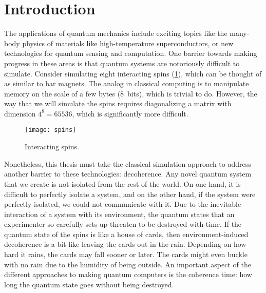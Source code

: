 \chapter*{Introduction}

The applications of quantum mechanics include exciting topics like the many-body
physics of materials like high-temperature superconductors, or new technologies
for quantum sensing and computation. One barrier towards making progress in
these areas is that quantum systems are notoriously difficult to simulate.
Consider simulating eight interacting spins (\cref{fig:spins}), which can be
thought of as similar to bar magnets. The analog in classical computing is to
manipulate memory on the scale of a few bytes (\SI{8}{bits}), which is trivial
to do. However, the way that we will simulate the spins requires diagonalizing a
matrix with dimension $4^8 = \num{65536}$, which is significantly more
difficult.

\begin{figure}[ht]
  \centering
  \texttt{[image: spins]}
  \caption{%
    Interacting spins.
  }\label{fig:spins}
\end{figure}

Nonetheless, this thesis must take the classical simulation approach to address
another barrier to these technologies: decoherence. Any novel quantum system
that we create is not isolated from the rest of the world. On one hand, it is
difficult to perfectly isolate a system, and on the other hand, if the system
were perfectly isolated, we could not communicate with it. Due to the inevitable
interaction of a system with its environment, the quantum states that an
experimenter so carefully sets up threaten to be destroyed with time. If the
quantum state of the spins is like a house of cards, then environment-induced
decoherence is a bit like leaving the cards out in the rain. Depending on how
hard it rains, the cards may fall sooner or later. The cards might even buckle
with no rain due to the humidity of being outside. An important aspect of the
different approaches to making quantum computers is the coherence time: how long
the quantum state goes without being destroyed.

